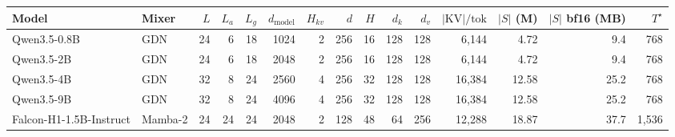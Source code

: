 \begin{tabular}{llrrrrrrrrrrrrr}
\toprule
Model & Mixer & $L$ & $L_a$ & $L_g$ & $d_{\text{model}}$ & $H_{kv}$ & $d$ & $H$ & $d_k$ & $d_v$ & $|\mathrm{KV}|/\text{tok}$ & $|S|$ (M) & $|S|$ bf16 (MB) & $T^\star$ \\
\midrule
Qwen3.5-0.8B & GDN & 24 & 6 & 18 & 1024 & 2 & 256 & 16 & 128 & 128 & 6,144 & 4.72 & 9.4 & 768 \\
Qwen3.5-2B & GDN & 24 & 6 & 18 & 2048 & 2 & 256 & 16 & 128 & 128 & 6,144 & 4.72 & 9.4 & 768 \\
Qwen3.5-4B & GDN & 32 & 8 & 24 & 2560 & 4 & 256 & 32 & 128 & 128 & 16,384 & 12.58 & 25.2 & 768 \\
Qwen3.5-9B & GDN & 32 & 8 & 24 & 4096 & 4 & 256 & 32 & 128 & 128 & 16,384 & 12.58 & 25.2 & 768 \\
Falcon-H1-1.5B-Instruct & Mamba-2 & 24 & 24 & 24 & 2048 & 2 & 128 & 48 & 64 & 256 & 12,288 & 18.87 & 37.7 & 1,536 \\
\bottomrule
\end{tabular}
